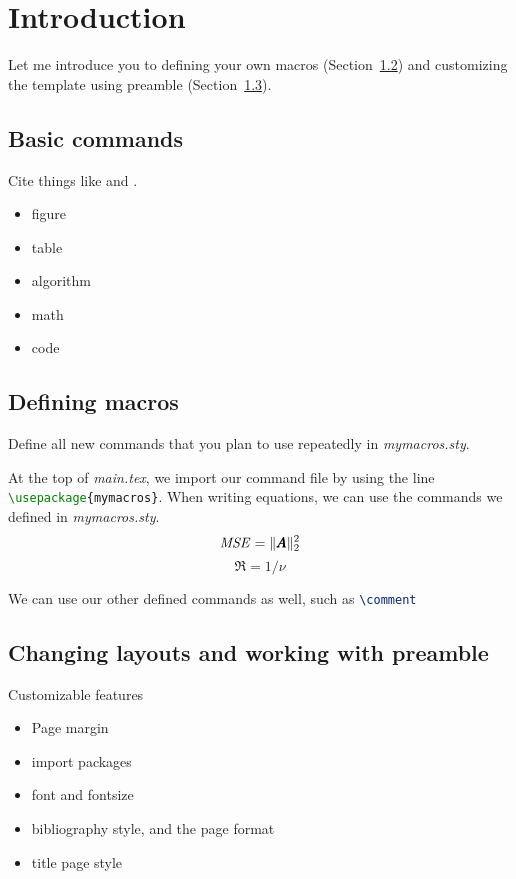 \chapter{Introduction}\label{chapter:intro}
Let me introduce you to defining your own macros (Section~\ref{sec:intro:macros}) and customizing the template using preamble (Section~\ref{sec:intro:layouts}).


\section{Basic commands}
Cite things like \citet{adrian1979ConditionalEddiesIsotropic} and \citep{agostini2020ExplorationPredictionFluid}.

\begin{itemize}
    \item figure
    \item table
    \item algorithm
    \item math
    \item code
\end{itemize}


\section{Defining macros}\label{sec:intro:macros}
Define all new commands that you plan to use repeatedly in \emph{mymacros.sty}.

At the top of \emph{main.tex}, we import our command file by using the line \lstinline[language=tex]!\usepackage{mymacros}!.
When writing equations, we can use the commands we defined in \emph{mymacros.sty}.
\begin{equation}
    \mbox{\textit{MSE}} = \| \pmb{A} \|^2_2
\end{equation}
\begin{equation*}
    \Re = 1/\nu
\end{equation*}

We can use our other defined commands as well, such as \lstinline[language=tex]!\comment! 


\section{Changing layouts and working with preamble}\label{sec:intro:layouts}
Customizable features 
\begin{itemize}
    \item Page margin
    \item import packages
    \item font and fontsize
    \item bibliography style, and the page format
    \item title page style
\end{itemize}
